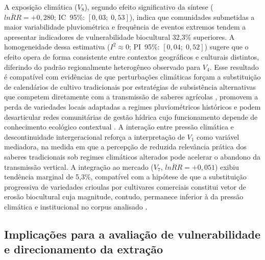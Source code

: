 A exposição climática ($V_8$), segundo efeito significativo da síntese ($\overline{lnRR} = +0{,}280$; IC~95\%: $[0{,}03;\; 0{,}53]$), indica que comunidades submetidas a maior variabilidade pluviométrica e frequência de eventos extremos tendem a apresentar indicadores de vulnerabilidade biocultural 32,3\% superiores. A homogeneidade dessa estimativa ($I^2 \approx 0$; PI~95\%: $[0{,}04;\; 0{,}52]$) sugere que o efeito opera de forma consistente entre contextos geográficos e culturais distintos, diferindo do padrão regionalmente heterogêneo observado para $V_4$. Esse resultado é compatível com evidências de que perturbações climáticas forçam a substituição de calendários de cultivo tradicionais por estratégias de subsistência alternativas que competem diretamente com a transmissão de saberes agrícolas \cite{Aniah2019}, promovem a perda de variedades locais adaptadas a regimes pluviométricos históricos \cite{Savo2016} e podem desarticular redes comunitárias de gestão hídrica cujo funcionamento depende de conhecimento ecológico contextual \cite{Tran2025}. A interação entre pressão climática e descontinuidade intergeracional reforça a interpretação de $V_1$ como variável mediadora, na medida em que a percepção de reduzida relevância prática dos saberes tradicionais sob regimes climáticos alterados pode acelerar o abandono da transmissão vertical. A integração ao mercado ($V_7$, $\overline{lnRR} = +0{,}051$) exibiu tendência marginal de 5,3\%, compatível com a hipótese de que a substituição progressiva de variedades crioulas por cultivares comerciais constitui vetor de erosão biocultural cuja magnitude, contudo, permanece inferior à da pressão climática e institucional no corpus analisado \cite{ReyesGarcia2013}.

\subsection{Implicações para a avaliação de vulnerabilidade e direcionamento da extração}
\label{sec:vulnerability-implications_cap2}

